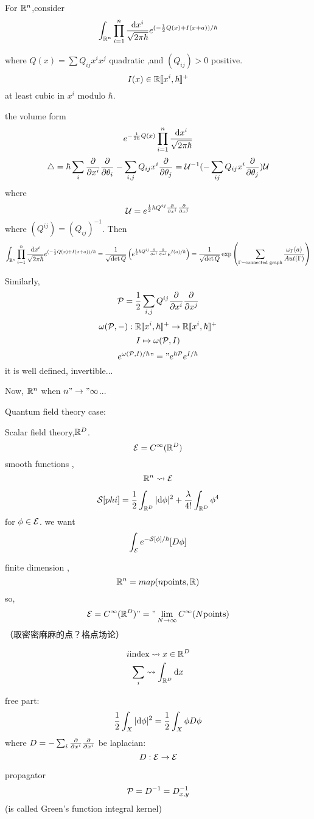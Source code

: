 For $\mathbb{R}^n$,consider
$$\int_{\mathbb{R}^n}\prod_{i=1}^n\frac{\mathrm{d} x^i}{\sqrt{2\pi\hbar}}
e^{(-\frac{1}{2}Q(x)+I(x+a))/\hbar}$$

where $Q(x)=\sum Q_{ij}x^ix^j$ quadratic ,and $(Q_{ij})>0$ positive.
$$I(x)\in\mathbb{R}[\![x^i,\hbar]\!]^+$$
at least cubic in $x^i$ modulo $\hbar$.

the volume form
$$e^{-\frac{1}{2\hbar}Q(x)}\prod_{i=1}^n\frac{\mathrm{d} x^i}{\sqrt{2\pi\hbar}}$$
$$\triangle=\hbar\sum_i\frac{\partial } {\partial x^i}\frac{\partial } {\partial \theta_i}-\sum_{i,j}Q_{ij}x^i\frac{\partial } {\partial \theta_j}
=\mathcal{U}^{-1}(-\sum_{ij}Q_{ij}x^i\frac{\partial } {\partial \theta_j})\mathcal{U}$$
where
$$\mathcal{U}=e^{\frac{1}{2}\hbar Q^{ij}\frac{\partial } {\partial x^i}\frac{\partial } {\partial x^j}}$$
where $(Q^{ij})=(Q_{ij})^{-1}$. Then
$$\int_{\mathbb{R}^n}\prod_{i=1}^n\frac{\mathrm{d} x^i}{\sqrt{2\pi\hbar}}
e^{(-\frac{1}{2}Q(x)+I(x+a))/\hbar}
=\frac{1}{\sqrt{\det Q}}
  \left(
    e^{\frac{1}{2}\hbar Q^{ij}\frac{\partial } {\partial a^i}\frac{\partial } {\partial a^j}}e^{I(a)/\hbar}
  \right)
=
  \frac{1}{\sqrt{\det Q}}
  \exp\left(
    \sum_{\Gamma-\text{connected graph}}
      \frac{\omega_\Gamma(a)}{Aut(\Gamma)}
  \right)
$$

Similarly,
$$\mathcal{P}=\frac{1}{2}\sum_{i,j}Q^{ij}\frac{\partial } {\partial x^i}\frac{\partial } {\partial x^j}$$
$$\omega(\mathcal{P},-):\mathbb{R}[\![x^i,\hbar]\!]^+\to\mathbb{R}[\![x^i,\hbar]\!]^+$$
$$I\mapsto \omega(\mathcal{P},I)$$
$$e^{\omega(\mathcal{P},I)/\hbar}"="e^{\hbar\mathcal{P}}e^{I/\hbar}$$
it is well defined, invertible...

Now, $\mathbb{R}^n$ when $n"\to"\infty$...

Quantum field theory case:

\begin{example}Scalar field theory,$\mathbb{R}^D$.
$$\mathcal{E}=C^{\infty}(\mathbb{R}^D)$$
smooth functions ,
$$\mathbb{R}^n\rightsquigarrow\mathcal{E}$$

$$\mathcal{S}[phi]=\frac{1}{2}
\int_{\mathbb{R}^D}
  |\mathrm{d}\phi|^2
 +\frac{\lambda}{4!}
  \int_{\mathbb{R}^D}\phi^4
$$
for $\phi\in\mathcal{E}$. we want
$$\int_{\mathcal{E}}e^{-\mathcal{S}[\phi]/\hbar}[D\phi]$$
\end{example}

finite dimension ,
$$\mathbb{R}^n=map(n \text{points},\mathbb{R})$$
so,
$$\mathcal{E}=C^{\infty}(\mathbb{R}^D)"="\lim_{N\to\infty}C^{\infty}(N \text{points})$$
（取密密麻麻的点？格点场论）

$$i \text{index}\rightsquigarrow x\in\mathbb{R}^D$$
$$\sum_i\rightsquigarrow\int_{\mathbb{R}^D}\mathrm{d} x$$

free part:
$$\frac{1}{2}\int_X|\mathrm{d}\phi|^2
=\frac{1}{2}\int_X\phi D\phi
$$
where $D=-\sum_i\frac{\partial } {\partial x^i}\frac{\partial } {\partial x^i}$ be laplacian:
$$D:\mathcal{E}\to\mathcal{E}$$

propagator
$$\mathcal{P}=D^{-1}=D^{-1}_{x,y}$$
(is called Green's function integral kernel)

